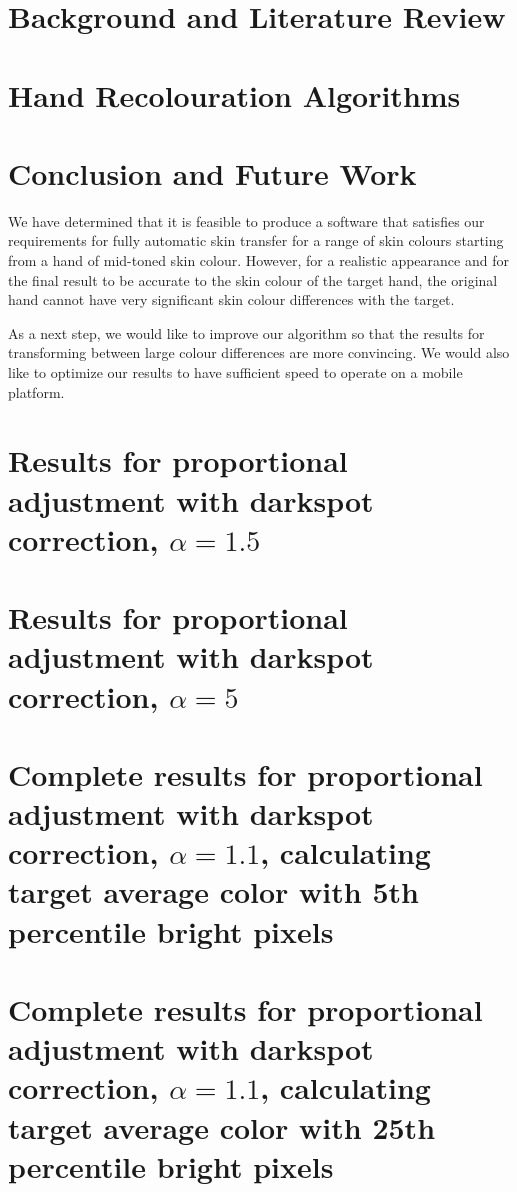 \documentclass[12pt, a4paper]{article}
\begin{document}
\section{Background and Literature Review}

\pagebreak

\section{Hand Recolouration Algorithms}

\pagebreak

\section{Conclusion and Future Work}
We have determined that it is feasible to produce a software that satisfies our requirements for fully automatic skin transfer for a range of skin colours starting from a hand of mid-toned skin colour. However, for a realistic appearance and for the final result to be accurate to the skin colour of the target hand, the original hand cannot have very significant skin colour differences with the target.

As a next step, we would like to improve our algorithm so that the results for transforming between large colour differences are more convincing. We would also like to optimize our results to have sufficient speed to operate on a mobile platform.
\pagebreak



\pagebreak

\appendix
\section{Results for proportional adjustment with darkspot correction, $\alpha = 1.5$}\label{app:prop_corr_ave_a1p5}


\section{Results for proportional adjustment with darkspot correction, $\alpha = 5$}\label{app:prop_corr_ave_a5}


\section{Complete results for proportional adjustment with darkspot correction, $\alpha = 1.1$, calculating target average color with 5th percentile bright pixels}\label{app:prop_corr_ave_a1p1_perc5}


\section{Complete results for proportional adjustment with darkspot correction, $\alpha = 1.1$, calculating target average color with 25th percentile bright pixels}\label{app:prop_corr_ave_a1p1_perc25}

\end{document}
